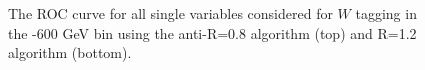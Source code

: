 \begin{figure}
\begin{center}
\caption{The ROC curve for all single variables considered for $W$
tagging in the -600 GeV bin using the anti-\kT R=0.8 algorithm
(top) and R=1.2 algorithm (bottom).}
\label{fig:pt500_single}
\end{center}
\end{figure}

